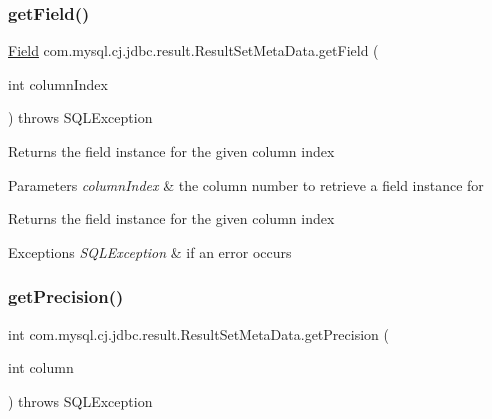 \subsubsection{\texorpdfstring{get\+Field()}{getField()}}
{\footnotesize\ttfamily \mbox{\hyperlink{classcom_1_1mysql_1_1cj_1_1result_1_1_field}{Field}} com.\+mysql.\+cj.\+jdbc.\+result.\+Result\+Set\+Meta\+Data.\+get\+Field (\begin{DoxyParamCaption}\item[{int}]{column\+Index }\end{DoxyParamCaption}) throws S\+Q\+L\+Exception\hspace{0.3cm}{\ttfamily [protected]}}

Returns the field instance for the given column index


\begin{DoxyParams}{Parameters}
{\em column\+Index} & the column number to retrieve a field instance for\\
\hline
\end{DoxyParams}
\begin{DoxyReturn}{Returns}
the field instance for the given column index
\end{DoxyReturn}

\begin{DoxyExceptions}{Exceptions}
{\em S\+Q\+L\+Exception} & if an error occurs \\
\hline
\end{DoxyExceptions}
\mbox{\label{classcom_1_1mysql_1_1cj_1_1jdbc_1_1result_1_1_result_set_meta_data_ad52b77534649ebdb9414a85c0ff7cf58}} 
\subsubsection{\texorpdfstring{get\+Precision()}{getPrecision()}}
{\footnotesize\ttfamily int com.\+mysql.\+cj.\+jdbc.\+result.\+Result\+Set\+Meta\+Data.\+get\+Precision (\begin{DoxyParamCaption}\item[{int}]{column }\end{DoxyParamCaption}) throws S\+Q\+L\+Exception}

